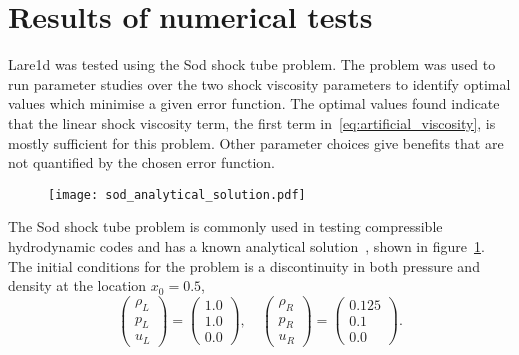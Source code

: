 \section{Results of numerical tests}

Lare1d was tested using the Sod shock tube problem. The problem was used to run parameter studies over the two shock viscosity parameters to identify optimal values which minimise a given error function. The optimal values found indicate that the linear shock viscosity term, the first term in~\eqref{eq:artificial_viscosity}, is mostly sufficient for this problem. Other parameter choices give benefits that are not quantified by the chosen error function.

\begin{figure}[t]
  \centering
  \texttt{[image: sod\_analytical\_solution.pdf]}
  \label{fig:sod_analytical_solution}
\end{figure}

The Sod shock tube problem is commonly used in testing compressible hydrodynamic codes and has a known analytical solution~\cite{sodSurveySeveralFinite1978}, shown in figure~\ref{fig:sod_analytical_solution}. The initial conditions for the problem is a discontinuity in both pressure and density at the location $x_0=0.5$,
\begin{equation}
  \label{eq:sod_problem_ic}
\begin{pmatrix}\rho _{L}\\p_{L}\\u_{L}\end{pmatrix}
=
\begin{pmatrix}1.0\\1.0\\0.0\end{pmatrix}, \quad
\begin{pmatrix}\rho _{R}\\p_{R}\\u_{R}\end{pmatrix}
=
\begin{pmatrix}0.125\\0.1\\0.0\end{pmatrix}.
\end{equation}

